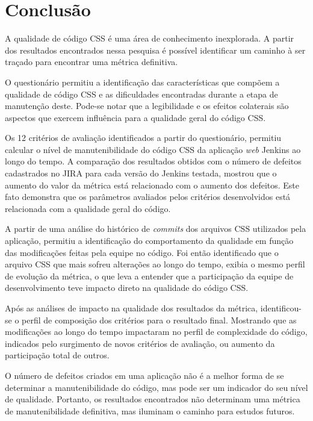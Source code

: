 %
%

\chapter{Conclusão}

A qualidade de código CSS é uma área de conhecimento inexplorada. A partir dos resultados encontrados nessa pesquisa é possível identificar um caminho à ser traçado para encontrar uma métrica definitiva.

O questionário permitiu a identificação das características que compõem a qualidade de código CSS e as dificuldades encontradas durante a etapa de manutenção deste. Pode-se notar que a legibilidade e os efeitos colaterais são aspectos que exercem influência para a qualidade geral do código CSS. 

Os 12 critérios de avaliação identificados a partir do questionário, permitiu calcular o nível de manutenibilidade do código CSS da aplicação \textit{web} Jenkins ao longo do tempo. A comparação dos resultados obtidos com o número de defeitos cadastrados no JIRA para cada versão do Jenkins testada, mostrou que o aumento do valor da métrica está relacionado com o aumento dos defeitos. Este fato demonstra que os parâmetros avaliados pelos critérios desenvolvidos está relacionada com a qualidade geral do código.

A partir de uma análise do histórico de \textit{commits} dos arquivos CSS utilizados pela aplicação, permitiu a identificação do comportamento da qualidade em função das modificações feitas pela equipe no código. Foi então identificado que o arquivo CSS que mais sofreu alterações ao longo do tempo, exibia o mesmo perfil de evolução da métrica, o que leva a entender que a participação da equipe de desenvolvimento teve impacto direto na qualidade do código CSS.

Após as análises de impacto na qualidade dos resultados da métrica, identificou-se o perfil de composição dos critérios para o resultado final. Mostrando que as modificações ao longo do tempo impactaram no perfil de complexidade do código, indicados pelo surgimento de novos critérios de avaliação, ou aumento da participação total de outros.

O número de defeitos criados em uma aplicação não é a melhor forma de se determinar a manutenibilidade do código, mas pode ser um indicador do seu nível de qualidade. Portanto, os resultados encontrados não determinam uma métrica de manutenibilidade definitiva, mas iluminam o caminho para estudos futuros.

